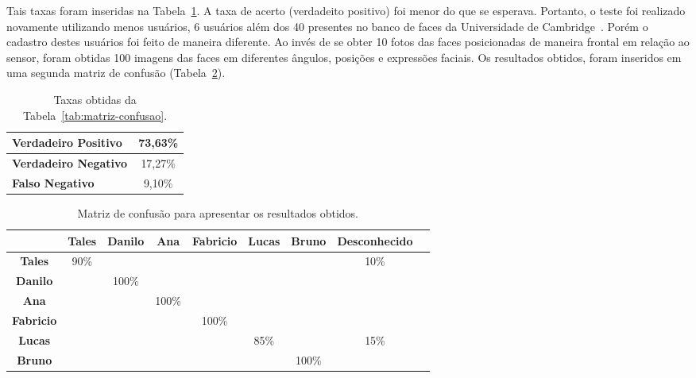 	Tais taxas foram inseridas na Tabela~\ref{tab:taxas}. A taxa de acerto
	(verdadeito positivo) foi menor do que se esperava. Portanto, o teste foi
	realizado novamente utilizando menos usuários, 6 usuários além dos 40
	presentes no banco de faces da Universidade de
	Cambridge~\cite{cambridgeFaceDb}. Porém o cadastro destes usuários foi feito
	de maneira diferente. Ao invés de se obter 10 fotos das faces posicionadas de
	maneira frontal em relação ao sensor, foram obtidas 100 imagens das faces em
	diferentes ângulos, posições e expressões faciais. Os resultados obtidos, foram inseridos em uma
	segunda matriz de confusão (Tabela~\ref{tab:matriz-confusao2}).

	\begin{table}[htb]
		\begin{center}
			\caption{Taxas obtidas da Tabela~\ref{tab:matriz-confusao}.}
			\label{tab:taxas}
			\begin{tabular}{|l|c|}
				\hline \bf Verdadeiro Positivo & 73,63\% \\
				\hline \bf Verdadeiro Negativo & 17,27\% \\
				\hline \bf Falso Negativo & 9,10\% \\
				\hline
			\end{tabular}
		\end{center}
	\end{table}


	\begin{table}[htb]
		\begin{center}
			\caption{Matriz de confusão para apresentar os resultados obtidos.}
			\label{tab:matriz-confusao2}
			  \begin{tabular}{|c|c|c|c|c|c|c|c|c|}

				\hline  & \bf Tales & \bf Danilo & \bf Ana & \bf Fabricio & \bf Lucas & \bf Bruno &  \bf Desconhecido\\
				 
				\hline \bf Tales 		& 90\% & 			& 		 & 			&   	 & 			& 10\%		\\
				\hline \bf Danilo 	& 		 & 100\%& 		 & 			&   	 & 			& 		 		\\
				\hline \bf Ana 			& 		 & 			& 100\%& 			&   	 & 			& 		    \\
				\hline \bf Fabricio & 		 & 			& 		 &100\%      &      & 			&      		\\
				\hline \bf Lucas 		& 		 & 			& 		 & 			& 85\% & 			& 15\%		\\
				\hline \bf Bruno 		& 		 & 			& 		 & 			& 		 & 100\%& 		  	\\
				\hline
			\end{tabular}
		\end{center}
	\end{table}


